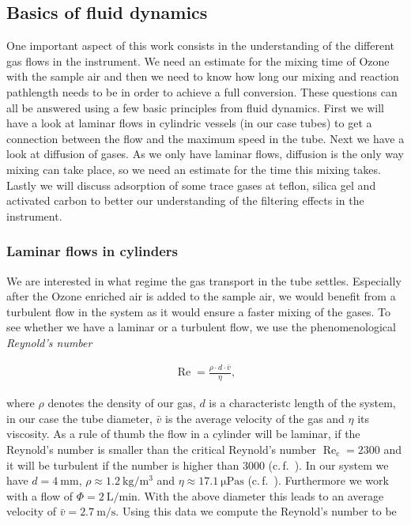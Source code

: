 \subsection{Basics of fluid dynamics}
\label{sec:fluid}

One important aspect of this work consists in the understanding of the
different gas flows in the instrument. We need an estimate for the
mixing time of Ozone with the sample air and then we need to know how
long our mixing and reaction pathlength needs to be in order to
achieve a full conversion. These questions can all be answered using a
few basic principles from fluid dynamics. First we will have a look at
laminar flows in cylindric vessels (in our case tubes) to get a
connection between the flow and the maximum speed in the tube. Next we
have a look at diffusion of gases. As we only have laminar flows,
diffusion is the only way mixing can take place, so we need an
estimate for the time this mixing takes. Lastly we will discuss
adsorption of some trace gases at teflon, silica gel and activated
carbon to better our understanding of the filtering effects in the
instrument. 

\subsubsection{Laminar flows in cylinders}
\label{sec:cylinder}

We are interested in what regime the gas transport in the tube
settles. Especially after the Ozone enriched air is added to the
sample air, we would benefit from a turbulent flow in the system as
it would ensure a faster mixing of the gases. To see whether we have
a laminar or a turbulent flow, we use the phenomenological \emph{Reynold's
number}

\begin{align*}
  \operatorname{Re} = \frac{\rho \cdot d \cdot \bar v}{\eta},
\end{align*}

where $\rho$ denotes the density of our gas, $d$ is a characteristc
length of the system, in our case the tube diameter, $\bar v$ is the
average velocity of the gas and $\eta$ its viscosity. As a rule of
thumb the flow in a cylinder will be laminar, if the Reynold's number
is smaller than the critical Reynold's number
$\operatorname{Re}_{\text{c}} = 2300$ and it will be turbulent if the
number is higher than $3000$ (c.\,f.~\cite{maschbau}). In our system
we have $d = \SI{4}{\milli\meter}$, $\rho \approx
\SI{1.2}{\kilo\gram\per\cubic\meter}$ and $\eta \approx
\SI{17.1}{\micro\pascal\second}$ (c.\,f.~\cite{maschbau}). Furthermore
we work with a flow of $\Phi = \SI{2}{\liter\per\minute}$. With the
above diameter this leads to an average velocity of $\bar v =
\SI{2.7}{\meter\per\second}$. Using this data we compute the Reynold's
number to be


